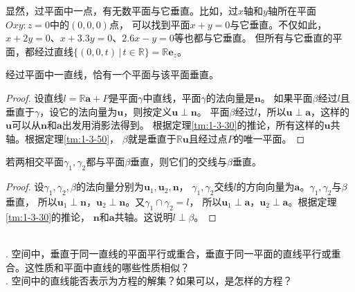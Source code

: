 \documentclass[12pt,UTF8]{ctexbook}
\begin{document}
显然，过平面中一点，有无数平面与它垂直。比如，过$x$轴和$y$轴所在平面$Oxy: z = 0$中的$(0,0,0)$点，
可以找到平面$x + y = 0$与它垂直。不仅如此，$x + 2y = 0$、$x + 3.3y = 0$、$2.6x - y = 0$等也都与它垂直。
但所有与它垂直的平面，都经过直线$\{(0,0,t) \, | \, t\in \mathbb{R}\} = \mathbb{R}\mathbf{e}_z$。
\begin{tm}\label{tm:1-3-90}
    经过平面中一直线，恰有一个平面与该平面垂直。    
\end{tm}
\begin{proof}
    设直线$l = \mathbb{R}\mathbf{a} + P$是平面$\gamma$中直线，平面$\gamma$的法向量是$\mathbf{n}$。
    如果平面$\beta$经过$l$且垂直于$\gamma$，设它的法向量为$\mathbf{u}$，则按定义$\mathbf{u}\perp\mathbf{n}$。
    平面$\beta$经过$l$，所以$\mathbf{u}\perp\mathbf{a}$，这样的$\mathbf{u}$可以从$\mathbf{n}$和$\mathbf{a}$出发用消影法得到。
    根据定理\ref{tm:1-3-30}的推论，所有这样的$\mathbf{u}$共轴。根据定理\ref{tm:1-3-50}，
    $\beta$就是垂直于$\mathbb{R}\mathbf{u}$且经过点$P$的唯一平面。
\end{proof}
\begin{tm}\label{tm:1-3-100}
    若两相交平面$\gamma_1,\gamma_2$都与平面$\beta$垂直，则它们的交线与$\beta$垂直。
\end{tm}
\begin{proof}
    设$\gamma_1,\gamma_2,\beta$的法向量分别为$\mathbf{u}_1,\mathbf{u}_2,\mathbf{n}$，
    $\gamma_1,\gamma_2$交线$l$的方向向量为$\mathbf{a}$。$\gamma_1,\gamma_2$与$\beta$垂直，
    所以$\mathbf{u}_1\perp\mathbf{n}$，$\mathbf{u}_2\perp\mathbf{n}$。又$\gamma_1\cap\gamma_2=l$，
    所以$\mathbf{u}_1\perp\mathbf{a}$，$\mathbf{u}_2\perp\mathbf{a}$。根据定理\ref{tm:1-3-30}的推论，
    $\mathbf{n}$和$\mathbf{a}$共轴。这说明$l\perp\beta$。
\end{proof}

\begin{sk}
    \mbox{} \\
    . 空间中，垂直于同一直线的平面平行或重合，垂直于同一平面的直线平行或重合。这性质和平面中直线的哪些性质相似？\\
    . 空间中的直线能否表示为方程的解集？如果可以，是怎样的方程？
\end{sk}
\end{document}
